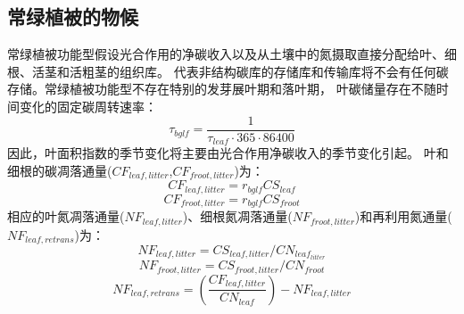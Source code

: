 \subsection{常绿植被的物候}\label{常绿植被的物候}
常绿植被功能型假设光合作用的净碳收入以及从土壤中的氮摄取直接分配给叶、细根、活茎和活粗茎的组织库。
代表非结构碳库的存储库和传输库将不会有任何碳存储。常绿植被功能型不存在特别的发芽展叶期和落叶期，
叶碳储量存在不随时间变化的固定碳周转速率：
\begin{equation}
\tau_{bglf}=\frac{1}{\tau_{leaf} \cdot 365 \cdot 86400}
\end{equation}
因此，叶面积指数的季节变化将主要由光合作用净碳收入的季节变化引起。
叶和细根的碳凋落通量($CF_{leaf,litter}$,$CF_{froot,litter}$)为：
\begin{equation}
CF_{leaf,litter}=r_{bglf} CS_{leaf}
\end{equation}
\begin{equation}
CF_{froot,litter}=r_{bglf} CS_{froot}
\end{equation}
相应的叶氮凋落通量($NF_{leaf,litter}$)、细根氮凋落通量($NF_{froot,litter}$)和再利用氮通量($NF_{leaf,retrans}$)为：
\begin{equation}
N F_{leaf,litter}=CS_{leaf,litter} / CN_{leaf_{litter}}
\end{equation}
\begin{equation}
N F_{froot,litter}=CS_{froot,litter} / CN_{froot}
\end{equation}
\begin{equation}
N F_{leaf,retrans}=\left(\frac{CF_{leaf,litter }}{CN_{leaf}}\right)-N F_{leaf,litter}
\end{equation}


